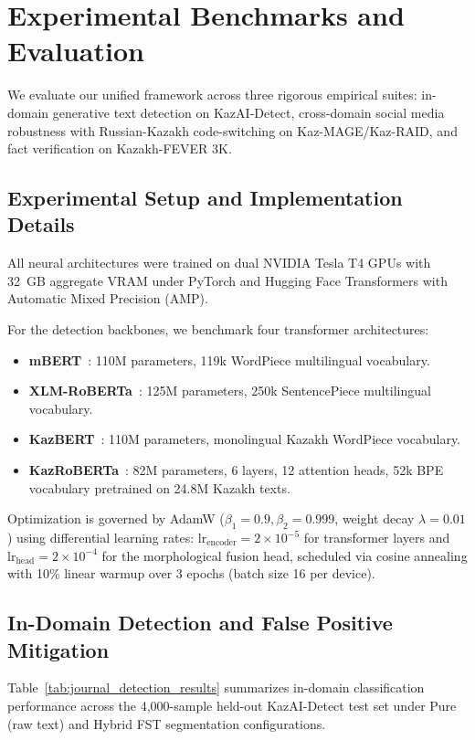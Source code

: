 \section{Experimental Benchmarks and Evaluation}
\label{sec:experimental_benchmarks}

We evaluate our unified framework across three rigorous empirical suites: in-domain generative text detection on KazAI-Detect, cross-domain social media robustness with Russian-Kazakh code-switching on Kaz-MAGE/Kaz-RAID, and fact verification on Kazakh-FEVER 3K.

\subsection{Experimental Setup and Implementation Details}
All neural architectures were trained on dual NVIDIA Tesla T4 GPUs with 32~GB aggregate VRAM under PyTorch and Hugging Face Transformers with Automatic Mixed Precision (AMP). 

For the detection backbones, we benchmark four transformer architectures:
\begin{itemize}
    \item \textbf{mBERT}~\citep{devlin2019bert}: 110M parameters, 119k WordPiece multilingual vocabulary.
    \item \textbf{XLM-RoBERTa}~\citep{conneau2020xlmr}: 125M parameters, 250k SentencePiece multilingual vocabulary.
    \item \textbf{KazBERT}~\citep{eraly2021kazbert}: 110M parameters, monolingual Kazakh WordPiece vocabulary.
    \item \textbf{KazRoBERTa}~\citep{sagyndyk2025kazroberta}: 82M parameters, 6 layers, 12 attention heads, 52k BPE vocabulary pretrained on 24.8M Kazakh texts.
\end{itemize}

Optimization is governed by AdamW ($\beta_1 = 0.9, \beta_2 = 0.999$, weight decay $\lambda = 0.01$) using differential learning rates: $\text{lr}_{\text{encoder}} = 2 \times 10^{-5}$ for transformer layers and $\text{lr}_{\text{head}} = 2 \times 10^{-4}$ for the morphological fusion head, scheduled via cosine annealing with 10\% linear warmup over 3 epochs (batch size 16 per device).

\subsection{In-Domain Detection and False Positive Mitigation}
Table~\ref{tab:journal_detection_results} summarizes in-domain classification performance across the 4,000-sample held-out KazAI-Detect test set under Pure (raw text) and Hybrid FST segmentation configurations.


